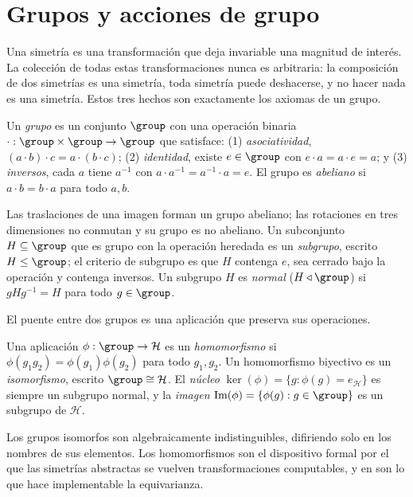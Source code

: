 \section{Grupos y acciones de grupo}
\label{sec:found:groups}

Una simetr\'ia es una transformaci\'on que deja invariable una magnitud de
inter\'es. La colecci\'on de todas estas transformaciones nunca es arbitraria: la
composici\'on de dos simetr\'ias es una simetr\'ia, toda simetr\'ia puede
deshacerse, y no hacer nada es una simetr\'ia. Estos tres hechos son exactamente
los axiomas de un grupo.

\begin{definition}[Grupo]
\label{def:found:group}
Un \emph{grupo} es un conjunto $\group$ con una operaci\'on binaria
$\cdot : \group \times \group \to \group$ que satisface: (1) \emph{asociatividad},
$(a \cdot b) \cdot c = a \cdot (b \cdot c)$; (2) \emph{identidad}, existe
$e \in \group$ con $e \cdot a = a \cdot e = a$; y (3) \emph{inversos}, cada $a$
tiene $a^{-1}$ con $a \cdot a^{-1} = a^{-1} \cdot a = e$. El grupo es
\emph{abeliano} si $a \cdot b = b \cdot a$ para todo $a, b$.
\end{definition}

Las traslaciones de una imagen forman un grupo abeliano; las rotaciones en tres
dimensiones no conmutan y su grupo es no abeliano. Un subconjunto $H \subseteq
\group$ que es grupo con la operaci\'on heredada es un \emph{subgrupo}, escrito
$H \le \group$; el criterio de subgrupo es que $H$ contenga $e$, sea cerrado bajo
la operaci\'on y contenga inversos. Un subgrupo $H$ es \emph{normal}
($H \triangleleft \group$) si $gHg^{-1} = H$ para todo $g \in \group$.

El puente entre dos grupos es una aplicaci\'on que preserva sus operaciones.

\begin{definition}[Homomorfismo]
\label{def:found:homomorphism}
Una aplicaci\'on $\phi : \group \to \mathcal{H}$ es un \emph{homomorfismo} si
$\phi(g_1 g_2) = \phi(g_1)\phi(g_2)$ para todo $g_1, g_2$. Un homomorfismo
biyectivo es un \emph{isomorfismo}, escrito $\group \cong \mathcal{H}$. El
\emph{n\'ucleo} $\ker(\phi) = \{g : \phi(g) = e_{\mathcal{H}}\}$ es siempre un
subgrupo normal, y la \emph{imagen} $\Img(\phi) = \{\phi(g) : g \in \group\}$ es un
subgrupo de $\mathcal{H}$.
\end{definition}

Los grupos isomorfos son algebraicamente indistinguibles, difiriendo solo en los
nombres de sus elementos. Los homomorfismos son el dispositivo formal por el que
las simetr\'ias abstractas se vuelven transformaciones computables, y en
 son lo que hace implementable la equivarianza.

